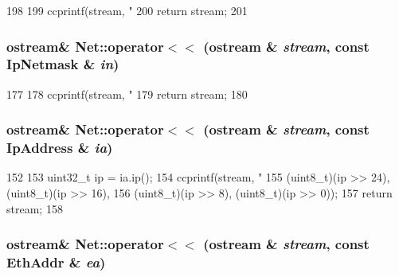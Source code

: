 \begin{DoxyCode}
198 {
199     ccprintf(stream, "%
200     return stream;
201 }
\end{DoxyCode}
\hypertarget{namespaceNet_ac5d1eaf544b16bb39dbcf35cf2630b24}{
\subsubsection[{operator$<$$<$}]{\setlength{\rightskip}{0pt plus 5cm}ostream\& Net::operator$<$$<$ (ostream \& {\em stream}, \/  const IpNetmask \& {\em in})}}
\label{namespaceNet_ac5d1eaf544b16bb39dbcf35cf2630b24}



\begin{DoxyCode}
177 {
178     ccprintf(stream, "%
179     return stream;
180 }
\end{DoxyCode}
\hypertarget{namespaceNet_a375cbbb01685429061c5da6797bdfcf5}{
\subsubsection[{operator$<$$<$}]{\setlength{\rightskip}{0pt plus 5cm}ostream\& Net::operator$<$$<$ (ostream \& {\em stream}, \/  const IpAddress \& {\em ia})}}
\label{namespaceNet_a375cbbb01685429061c5da6797bdfcf5}



\begin{DoxyCode}
152 {
153     uint32_t ip = ia.ip();
154     ccprintf(stream, "%
155             (uint8_t)(ip >> 24), (uint8_t)(ip >> 16),
156             (uint8_t)(ip >> 8),  (uint8_t)(ip >> 0));
157     return stream;
158 }
\end{DoxyCode}
\hypertarget{namespaceNet_a6ee6ae0fe485e2f01a9b42ab77329d7d}{
\subsubsection[{operator$<$$<$}]{\setlength{\rightskip}{0pt plus 5cm}ostream\& Net::operator$<$$<$ (ostream \& {\em stream}, \/  const EthAddr \& {\em ea})}}
\label{namespaceNet_a6ee6ae0fe485e2f01a9b42ab77329d7d}



